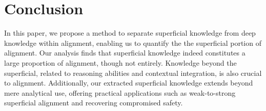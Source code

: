 \section{Conclusion}
\label{sec:conclusion}

In this paper, we propose a method to separate superficial knowledge from deep knowledge within alignment, enabling us to quantify the the superficial portion of alignment. Our analysis finds that superficial knowledge indeed constitutes a large proportion of alignment, though not entirely.   Knowledge beyond the superficial, related to reasoning abilities and contextual integration, is also crucial to alignment. Additionally, our extracted superficial knowledge extends beyond mere analytical use, offering practical applications such as weak-to-strong superficial alignment and recovering compromised safety.





